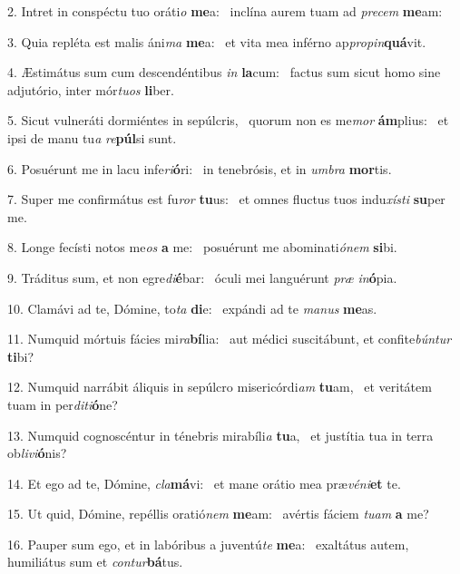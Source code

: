 2. Intret in conspéctu tuo oráti\textit{o} \textbf{me}a: \ast\  inclína aurem tuam ad \textit{pre}\textit{cem} \textbf{me}am:\

3. Quia repléta est malis áni\textit{ma} \textbf{me}a: \ast\  et vita mea inférno ap\textit{pro}\textit{pin}\textbf{quá}vit.\

4. Æstimátus sum cum descendéntibus \textit{in} \textbf{la}cum: \ast\  factus sum sicut homo sine adjutório, inter mór\textit{tu}\textit{os} \textbf{li}ber.\

5. Sicut vulneráti dormiéntes in sepúlcris, \dag\  quorum non es me\textit{mor} \textbf{ám}plius: \ast\  et ipsi de manu tu\textit{a} \textit{re}\textbf{púl}si sunt.\

6. Posuérunt me in lacu infe\textit{ri}\textbf{ó}ri: \ast\  in tenebrósis, et in \textit{um}\textit{bra} \textbf{mor}tis.\

7. Super me confirmátus est fu\textit{ror} \textbf{tu}us: \ast\  et omnes fluctus tuos indu\textit{xís}\textit{ti} \textbf{su}per me.\

8. Longe fecísti notos me\textit{os} \textbf{a} me: \ast\  posuérunt me abominati\textit{ó}\textit{nem} \textbf{si}bi.\

9. Tráditus sum, et non egre\textit{di}\textbf{é}bar: \ast\  óculi mei languérunt \textit{præ} \textit{in}\textbf{ó}pia.\

10. Clamávi ad te, Dómine, to\textit{ta} \textbf{di}e: \ast\  expándi ad te \textit{ma}\textit{nus} \textbf{me}as.\

11. Numquid mórtuis fácies mi\textit{ra}\textbf{bí}lia: \ast\  aut médici suscitábunt, et confite\textit{bún}\textit{tur} \textbf{ti}bi?\

12. Numquid narrábit áliquis in sepúlcro misericórdi\textit{am} \textbf{tu}am, \ast\  et veritátem tuam in per\textit{di}\textit{ti}\textbf{ó}ne?\

13. Numquid cognoscéntur in ténebris mirabíli\textit{a} \textbf{tu}a, \ast\  et justítia tua in terra ob\textit{li}\textit{vi}\textbf{ó}nis?\

14. Et ego ad te, Dómine, \textit{cla}\textbf{má}vi: \ast\  et mane orátio mea præ\textit{vé}\textit{ni}\textbf{et} te.\

15. Ut quid, Dómine, repéllis oratió\textit{nem} \textbf{me}am: \ast\  avértis fáciem \textit{tu}\textit{am} \textbf{a} me?\

16. Pauper sum ego, et in labóribus a juventú\textit{te} \textbf{me}a: \ast\  exaltátus autem, humiliátus sum et \textit{con}\textit{tur}\textbf{bá}tus.\

